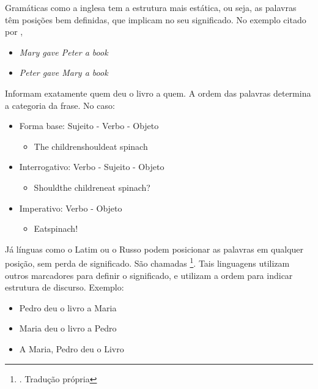 Gramáticas como a inglesa tem a estrutura mais estática, ou seja, as palavras têm posições bem definidas, que implicam no seu significado. No exemplo citado por ,
\begin{itemize}
    \item \textit{Mary gave Peter a book}
    \item \textit{Peter gave Mary a book}
\end{itemize}
Informam exatamente quem deu o livro a quem. A ordem das palavras determina a categoria da frase. No caso:
\begin{itemize}
    \item Forma base: Sujeito - Verbo - Objeto
    \begin{itemize}
        \item \lbrack The children\rbrack \lbrack should\rbrack \lbrack eat spinach\rbrack
    \end{itemize}
    \item Interrogativo: Verbo - Sujeito - Objeto
    \begin{itemize}
        \item \lbrack Should\rbrack \lbrack the children\rbrack \lbrack eat spinach\rbrack?
    \end{itemize}
    \item Imperativo: Verbo - Objeto
    \begin{itemize}
        \item \lbrack Eat\rbrack \lbrack spinach\rbrack!
    \end{itemize}
\end{itemize}
Já línguas como o Latim ou o Russo podem posicionar as palavras em qualquer posição, sem perda de significado. São chamadas 
\footnote{. Tradução própria}. Tais linguagens utilizam outros marcadores para definir o significado, e utilizam a ordem para indicar estrutura de discurso. Exemplo:
\begin{itemize}
    \item Pedro deu o livro a Maria
    \item Maria deu o livro a Pedro
    \item A Maria, Pedro deu o Livro
\end{itemize}

